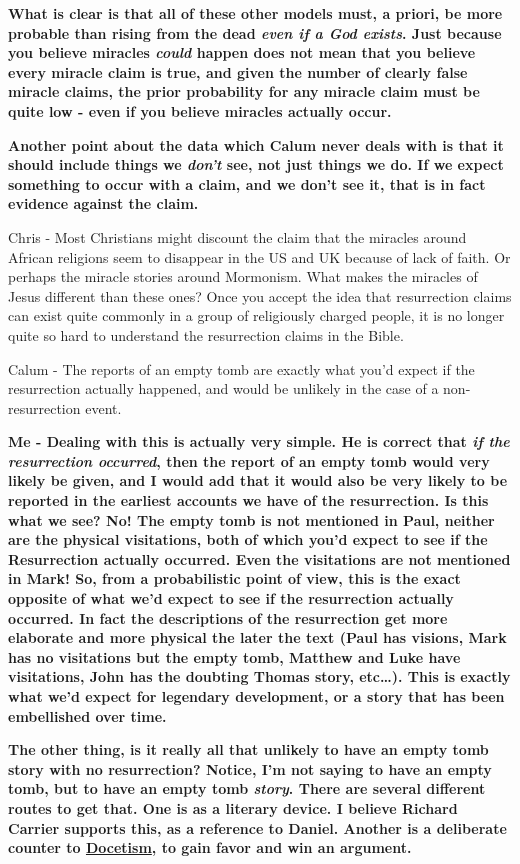 \documentclass{tufte-book}
\begin{document}
\textbf{What is clear is that all of these other models must, a priori,
be more probable than rising from the dead \emph{even if a God exists}.
Just because you believe miracles \emph{could} happen does not mean that
you believe every miracle claim is true, and given the number of clearly
false miracle claims, the prior probability for any miracle claim must
be quite low - even if you believe miracles actually occur.}

\textbf{Another point about the data which Calum never deals with is
that it should include things we \emph{don't} see, not just things we
do. If we expect something to occur with a claim, and we don't see it,
that is in fact evidence against the claim.}

Chris - Most Christians might discount the claim that the miracles
around African religions seem to disappear in the US and UK because of
lack of faith. Or perhaps the miracle stories around Mormonism. What
makes the miracles of Jesus different than these ones? Once you accept
the idea that resurrection claims can exist quite commonly in a group of
religiously charged people, it is no longer quite so hard to understand
the resurrection claims in the Bible.

Calum - The reports of an empty tomb are exactly what you'd expect if
the resurrection actually happened, and would be unlikely in the case of
a non-resurrection event.

\textbf{Me - Dealing with this is actually very simple. He is correct
that \emph{if the resurrection occurred}, then the report of an empty
tomb would very likely be given, and I would add that it would also be
very likely to be reported in the earliest accounts we have of the
resurrection. Is this what we see? No! The empty tomb is not mentioned
in Paul, neither are the physical visitations, both of which you'd
expect to see if the Resurrection actually occurred. Even the
visitations are not mentioned in Mark! So, from a probabilistic point of
view, this is the exact opposite of what we'd expect to see if the
resurrection actually occurred. In fact the descriptions of the
resurrection get more elaborate and more physical the later the text
(Paul has visions, Mark has no visitations but the empty tomb, Matthew
and Luke have visitations, John has the doubting Thomas story,
etc\ldots{}). This is exactly what we'd expect for legendary
development, or a story that has been embellished over time.}

\textbf{The other thing, is it really all that unlikely to have an empty
tomb story with no resurrection? Notice, I'm not saying to have an empty
tomb, but to have an empty tomb \emph{story}. There are several
different routes to get that. One is as a literary device. I believe
Richard Carrier supports this, as a reference to Daniel. Another is a
deliberate counter to
\href{http://en.wikipedia.org/wiki/Docetism}{Docetism}, to gain favor
and win an argument.}
\end{document}
